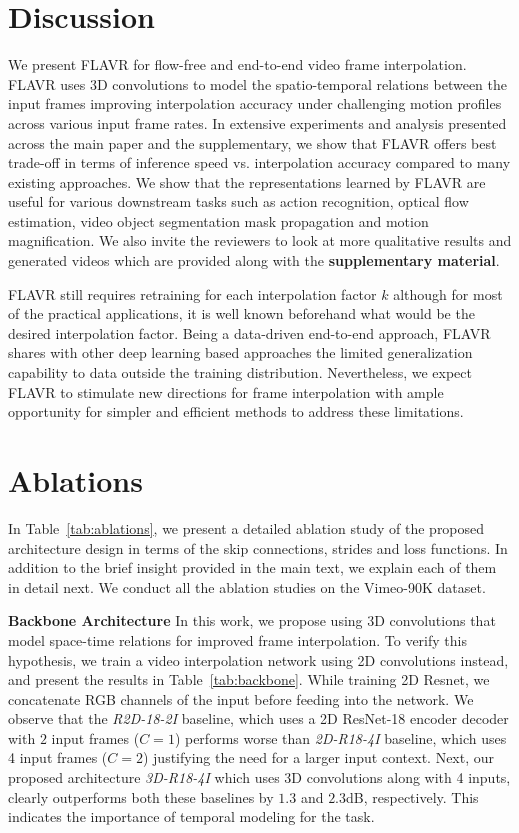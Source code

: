 \documentclass[10pt,twocolumn,letterpaper]{article}
\newcommand{\tabref}[1]{Table~\ref{#1}}
\newcommand{\Ours}{FLAVR}
\begin{document}
\vspace{-5pt}
\section{Discussion}
\label{sec:conclusion}

We present \Ours{} for flow-free and end-to-end video frame interpolation. \Ours{} uses 3D convolutions to model the spatio-temporal relations between the input frames improving interpolation accuracy under challenging motion profiles across various input frame rates. In extensive experiments and analysis presented across the main paper and the supplementary, we show that \Ours{} offers best trade-off in terms of inference speed vs. interpolation accuracy compared to many existing approaches. We show that the representations learned by \Ours{} are useful for various downstream tasks such as action recognition, optical flow estimation, video object segmentation mask propagation and motion magnification. We also invite the reviewers to look at more qualitative results and generated videos which are provided along with the \textbf{supplementary material}.

\Ours{} still requires retraining for each interpolation factor $k$ although for most of the practical applications, it is well known beforehand what would be the desired interpolation factor. Being a data-driven end-to-end approach, \Ours{} shares with other deep learning based approaches the limited generalization capability to data outside the training distribution. Nevertheless, we expect \Ours{} to stimulate new directions for frame interpolation with ample opportunity for simpler and efficient methods to address these limitations.



\section{ Ablations}

In \tabref{tab:ablations}, we present a detailed ablation study of the proposed architecture design in terms of the skip connections, strides and loss functions. In addition to the brief insight provided in the main text, we explain each of them in detail next. We conduct all the ablation studies on the Vimeo-90K dataset.

{\bf Backbone Architecture} In this work, we propose using 3D convolutions that model space-time relations for improved frame interpolation. To verify this hypothesis, we train a video interpolation network using 2D convolutions instead, and present the results in \tabref{tab:backbone}. While training 2D Resnet, we concatenate RGB channels of the input before feeding into the network. We observe that the \textit{R2D-18-2I} baseline, which uses a 2D ResNet-18 encoder decoder with $2$ input frames ($C=1$) performs worse than \textit{2D-R18-4I} baseline, which uses 4 input frames ($C=2$) justifying the need for a larger input context. Next, our proposed architecture \textit{3D-R18-4I} which uses 3D convolutions along with 4 inputs, clearly outperforms both these baselines by $1.3$ and $2.3$dB, respectively. This indicates the importance of temporal modeling for the task. 
\end{document}
